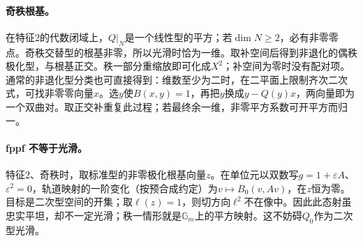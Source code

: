\documentclass[openany,fontset=fandol]{ctexbook}
\begin{document}
\paragraph{奇秩根基。}
在特征2的代数闭域上，$Q|_N$是一个线性型的平方；若$\dim N\ge2$，必有非零零点。奇秩交替型的根基非零，所以光滑时恰为一维。取补空间后得到非退化的偶秩极化型，与根基正交。秩一部分重缩放即可化成$X^2$；补空间为零时没有配对项。通常的非退化型分类也可直接得到：维数至少为二时，在二平面上限制齐次二次式，可找非零零向量$x$。选$y$使$B(x,y)=1$，再把$y$换成$y-Q(y)x$，两向量即为一个双曲对。取正交补重复此过程；若最终余一维，非零平方系数可开平方而归一。

\paragraph{fppf 不等于光滑。}
特征2、奇秩时，取标准型的非零极化根基向量$z$。在单位元以双数写$g=1+\varepsilon A$、$\varepsilon^2=0$，轨道映射的一阶变化（按预合成约定）为$v\mapsto B_0(v,Av)$，在$z$恒为零。目标是二次型空间的开集；取$\ell(z)=1$，则切方向$\ell^2$不在像中。因此此态射虽忠实平坦，却不一定光滑；秩一情形就是$\mathbb G_m$上的平方映射。这不妨碍$Q_0$作为二次型光滑。
\par\endgroup
\end{document}
